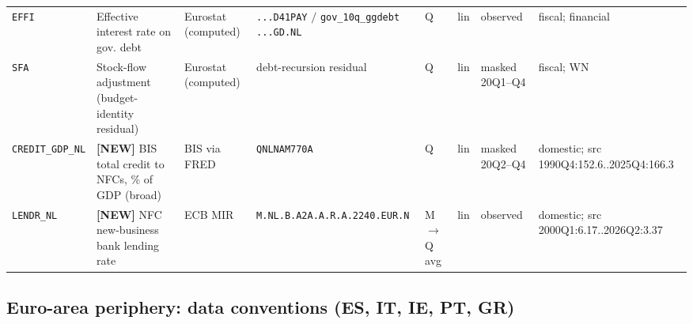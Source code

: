 \begin{longtable}{@{}p{}p{}p{}p{}p{}p{}p{}p{}@{}}
\texttt{EFFI}       & Effective interest rate on gov. debt & Eurostat (computed) & \texttt{...D41PAY} $/$ \texttt{gov\_10q\_ggdebt ...\allowbreak GD.\allowbreak NL} & Q & lin & observed & fiscal; financial \\
\texttt{SFA}        & Stock-flow adjustment (budget-identity residual) & Eurostat (computed) & debt-recursion residual & Q & lin & masked 20Q1--Q4 & fiscal; WN \\
\texttt{CREDIT\_GDP\_NL} & \textbf{[NEW]} BIS total credit to NFCs, \% of GDP (broad) & BIS via FRED & \texttt{QNLNAM770A} & Q & lin & masked 20Q2--Q4 & domestic; src 1990Q4:152.6..\allowbreak 2025Q4:166.3 \\
\texttt{LENDR\_NL}  & \textbf{[NEW]} NFC new-business bank lending rate & ECB MIR & \texttt{M.\allowbreak NL.\allowbreak B.\allowbreak A2A.\allowbreak A.\allowbreak R.\allowbreak A.2240.\allowbreak EUR.\allowbreak N} & M$\to$Q avg & lin & observed & domestic; src 2000Q1:6.17..\allowbreak 2026Q2:3.37 \\
\end{longtable}

\subsection{Euro-area periphery: data conventions (ES, IT, IE, PT, GR)}\label{sec:data:euro-periph}

